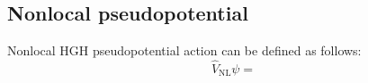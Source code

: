 \subsection{Nonlocal pseudopotential}

Nonlocal HGH pseudopotential action can be defined as follows:
\begin{equation}
\hat{V}_{\mathrm{NL}} \psi = 
\end{equation}




